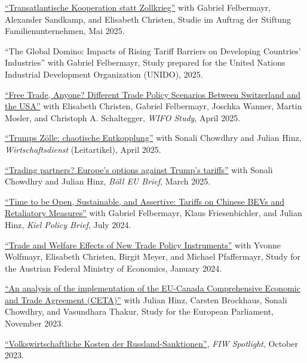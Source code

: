 \documentclass{article}
\newlength{\cvlabelwidth}\setlength{\cvlabelwidth}{0.12\textwidth}
\newlength{\cvlabelgap}\setlength{\cvlabelgap}{5mm}
\newcommand{\cvmakelabel}[1]{%
    \smash{\parbox[t]{\cvlabelwidth}{\raggedright{\fontfamily{phv}\selectfont #1}}}}
\newenvironment{cvsection}[1]{%
    \par\medskip
    \begin{list}{}{%
        \setlength{\leftmargin}{\dimexpr\cvlabelwidth+\cvlabelgap\relax}%
        \setlength{\labelwidth}{\cvlabelwidth}%
        \setlength{\labelsep}{\cvlabelgap}%
        \setlength{\rightmargin}{0pt}%
        \setlength{\itemindent}{0pt}%
        \setlength{\listparindent}{0pt}%
        \setlength{\topsep}{0pt}%
        \setlength{\partopsep}{0pt}%
        \setlength{\parsep}{0.3em}%
        \setlength{\itemsep}{0pt}%
        \let\makelabel\cvmakelabel%
    }%
    \item[#1]\ignorespaces%
}{%
    \end{list}\medskip%
}
\begin{document}
\begin{cvsection}{COMMENTARY \& POLICY REPORTS}
  \href{https://www.familienunternehmen.de/de/publikationen/transatlantische-kooperation-statt-zollkrieg}{``Transatlantische Kooperation statt Zollkrieg''} with Gabriel Felbermayr, Alexander Sandkamp, and Elisabeth Christen, Studie im Auftrag der Stiftung Familienunternehmen, Mai 2025. \par
  ``The Global Domino: Impacts of Rising Tariff Barriers on Developing Countries' Industries'' with Gabriel Felbermayr, Study prepared for the United Nations Industrial Development Organization (UNIDO), 2025. \par
  \href{https://www.wifo.ac.at/publication/pid/57956826}{``Free Trade, Anyone?
Different Trade Policy Scenarios Between Switzerland and the USA''} with Elisabeth Christen, Gabriel Felbermayr, 
Joschka Wanner, Martin Mosler, and Christoph A. Schaltegger, \textit{WIFO Study}, April 2025.\par
  \href{https://www.wirtschaftsdienst.eu/inhalt/jahr/2025/heft/4/beitrag/trumps-zoelle-chaotische-entkopplung.html}{``Trumps Zölle: chaotische Entkopplung''} with Sonali Chowdhry and Julian Hinz, \textit{Wirtschaftsdienst} (Leitartikel), April 2025.\par
    \href{https://eu.boell.org/sites/default/files/2025-03/2025_hbs_eu_policy_brief_trade_final.pdf}{``Trading partners? Europe's options against Trump's tariffs''} with Sonali Chowdhry and Julian Hinz, \textit{Böll EU Brief}, March 2025.\par
    \href{https://www.ifw-kiel.de/publications/time-to-be-open-sustainable-and-assertive-tariffs-on-chinese-bevs-and-retaliatory-measures-33083/}{``Time to be Open, Sustainable, and Assertive: Tariffs on Chinese BEVs and Retaliatory Measures''} with Gabriel Felbermayr, Klaus Friesenbichler, and Julian Hinz, \textit{Kiel Policy Brief}, July 2024.\par
    \href{https://www.fiw.ac.at/publications/trade-and-welfare-effects-of-new-trade-policy-instruments/}{``Trade and Welfare Effects of New Trade Policy Instruments''} with Yvonne Wolfmayr, Elisabeth Christen, Birgit Meyer, and Michael Pfaffermayr, Study for the Austrian Federal Ministry of Economics, January 2024.\par
    \href{https://www.europarl.europa.eu/RegData/etudes/IDAN/2023/754440/EXPO_IDA(2023)754440_EN.pdf}{``An analysis of the implementation of the EU-Canada Comprehensive Economic and Trade Agreement (CETA)''} with Julian Hinz, Carsten Brockhaus, Sonali Chowdhry, and Vasundhara Thakur, Study for the European Parliament, November 2023. \par
    \href{https://www.fiw.ac.at/2023/10/02/volkswirtschaftliche-kosten-der-russland-sanktionen/}{``Volkswirtschaftliche Kosten der Russland-Sanktionen''}, \textit{FIW Spotlight}, October 2023. \par


\end{cvsection}
\end{document}
